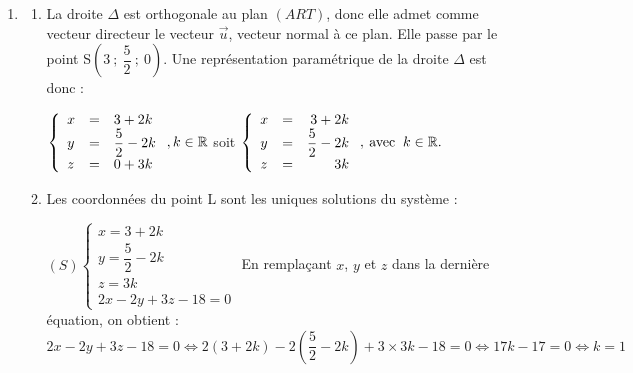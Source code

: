 \documentclass[10pt]{article}
\providecommand{\R}{\mathbb{R}}
\providecommand{\vect}[1]{\overrightarrow{#1}}
\begin{document}
\begin{enumerate}
\begin{enumerate}
		$\vect{n}.\vect{AR}=2\times 0+(-2)\times 3+3\times 2=-6+6=0$ et $\vect{n}.\vect{AT}=2\times(-3)+(-2)\times 0+3\times 2=-6+6=0$.
		
		Donc $\vect{n}\perp\vect{AR}$ et $\vect{n}\perp\vect{AT}$ donc $\vect{n}$ est normal à tout vecteur du plan $(ART)$, donc $\vect{n}$ est un vecteur normal au plan $(ART)$.
		\item Le plan $(ART)$ a pour équation cartésienne : $ax+by+cz+d = 0$, où $(a~;~b~;~c)$ sont les cordonnées d'un vecteur normal au plan. En prenant comme vecteur normal le vecteur $\vect{n}$, on obtient : $(ART)$ : $2x - 2y + 3z + d = 0$. 
				
Or $A\in \text{(ART)}$ donc $12-0+6+d=0$ donc $d=-18$.

Donc le plan $(ART)$ a pour équation $2x - 2y + 3z - 18 = 0$.
	\end{enumerate}
	\item 
	\begin{enumerate}
		\item La droite $\Delta$ est orthogonale au plan $(ART)$, donc elle admet comme vecteur directeur le vecteur $\vect{u}$, vecteur normal à ce plan. Elle passe par le point S$\left(3~;~\dfrac52~;~0\right)$. Une représentation paramétrique de la droite $\Delta$ est donc : 

		$\left\{\begin{array}{l c l}	x&=&3+2k\\y &=&\dfrac52-2k\\z&=&0+3k			\end{array}\right. , k \in \R$ soit 
		$\left\{\begin{array}{l c r}x&=&3+2k\\y&=& \dfrac52 - 2k\\z &=& 3k \end{array}\right.,\: \text{avec }\:k \in \R.$
		\item Les coordonnées du point L sont les uniques solutions du système :
		
$(S) \left\{\begin{array}{l}	x = 3 + 2k\\y =\dfrac52-2k\\z=3k\\2x - 2y + 3z - 18=0			\end{array}\right.$
		En remplaçant $x$, $y$ et $z$ dans la dernière équation, on obtient : 
$2x - 2y + 3z - 18=0 \iff 2(3+2k)-2\left(\dfrac52-2k\right)+3\times 3k-18=0 \iff 17k-17=0 \iff k=1$
		

\end{enumerate}
\end{enumerate}
\end{document}
